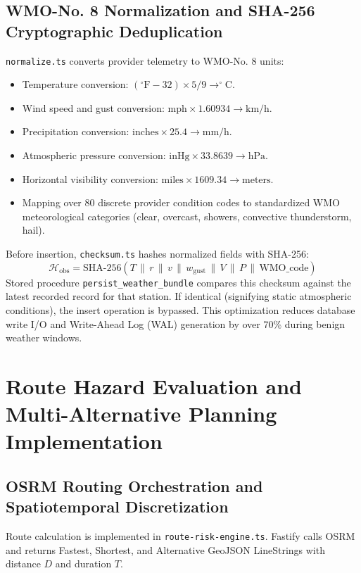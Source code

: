 \subsection{WMO-No. 8 Normalization and SHA-256 Cryptographic Deduplication}
\texttt{normalize.ts} converts provider telemetry to WMO-No. 8 units:
\begin{itemize}
    \item[-] Temperature conversion: $(^\circ\text{F} - 32) \times 5/9 \longrightarrow ^\circ\text{C}$.
    \item[-] Wind speed and gust conversion: $\text{mph} \times 1.60934 \longrightarrow \text{km/h}$.
    \item[-] Precipitation conversion: $\text{inches} \times 25.4 \longrightarrow \text{mm/h}$.
    \item[-] Atmospheric pressure conversion: $\text{inHg} \times 33.8639 \longrightarrow \text{hPa}$.
    \item[-] Horizontal visibility conversion: $\text{miles} \times 1609.34 \longrightarrow \text{meters}$.
    \item[-] Mapping over 80 discrete provider condition codes to standardized WMO meteorological categories (clear, overcast, showers, convective thunderstorm, hail).
\end{itemize}

Before insertion, \texttt{checksum.ts} hashes normalized fields with SHA-256:
\begin{equation}
\label{eq:checksum_hash_en}
\mathcal{H}_{\text{obs}} = \text{SHA-256}(T \,\|\, r \,\|\, v \,\|\, w_{\text{gust}} \,\|\, V \,\|\, P \,\|\, \text{WMO\_code})
\end{equation}
Stored procedure \texttt{persist\_weather\_bundle} compares this checksum against the latest recorded record for that station. If identical (signifying static atmospheric conditions), the insert operation is bypassed. This optimization reduces database write I/O and Write-Ahead Log (WAL) generation by over 70\% during benign weather windows.

\section{Route Hazard Evaluation and Multi-Alternative Planning Implementation}
\label{sec:route_hazard_impl}

\subsection{OSRM Routing Orchestration and Spatiotemporal Discretization}
Route calculation is implemented in \texttt{route-risk-engine.ts}. Fastify calls OSRM and returns Fastest, Shortest, and Alternative GeoJSON LineStrings with distance $D$ and duration $T$.

